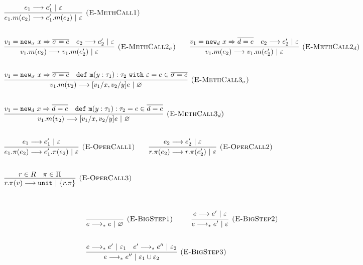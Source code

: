 \documentclass{llncs}
\newcommand{\keywadj}[1]{\mathtt{#1}}
\newcommand{\keyw}[1]{\keywadj{#1}~}
\begin{document}
\[
\begin{array}{lll}

	\infer[\textsc{(E-MethCall1)}]
		{e_1.m(e_2) \longrightarrow e_1'.m(e_2)~|~\varepsilon}
		{e_1 \longrightarrow e_1'~|~\varepsilon}\\[5ex]

	\infer[\textsc{(E-MethCall2$_{\sigma}$)}]
		{v_1.m(e_2) \longrightarrow v_1.m(e_2')~|~\varepsilon}
		{v_1 = \keywadj{new}_{\sigma}~x \Rightarrow \overline{\sigma = e} & e_2 \longrightarrow e_2'~|~\varepsilon}
				
		~~~~~~
	\infer[\textsc{(E-MethCall2$_d$)}]
		{v_1.m(e_2) \longrightarrow v_1.m(e_2')~|~\varepsilon}
		{v_1 = \keywadj{new}_{d}~x \Rightarrow \overline{d = e} & e_2 \longrightarrow e_2'~|~\varepsilon}
		\\[5ex]
		
	\infer[\textsc{(E-MethCall3$_{\sigma}$)}]
		{v_1.m(v_2)
			\longrightarrow
		 [v_1/x, v_2/y]e~|~\varnothing}
  		{v_1 = \keywadj{new}_{\sigma}~x \Rightarrow \overline{\sigma = e} & \keywadj{def~m}(y: \tau_1) : \tau_2~\keyw{with} \varepsilon = e \in \overline {\sigma = e}} \\[5ex]

	\infer[\textsc{(E-MethCall3$_{d}$)}]
		{v_1.m(v_2)
			\longrightarrow
		 [v_1/x, v_2/y]e~|~\varnothing}
  		{v_1 = \keywadj{new}_{d}~x \Rightarrow \overline{d = e} & \keywadj{def~m}(y: \tau_1) : \tau_2 = e \in \overline {d = e}} \\[5ex]
			
	\infer[\textsc{(E-OperCall1)}]
		{e_1.\pi(e_2)
			\longrightarrow
		 e_1'.\pi(e_2)~|~\varepsilon}
		{e_1 \longrightarrow e_1'~|~\varepsilon}
~~~~~~
			\infer[\textsc{(E-OperCall2)}]
		{r.\pi(e_2)
			\longrightarrow
		 r.\pi(e_2')~|~\varepsilon}
		{e_2 \longrightarrow e_2'~|~\varepsilon} \\[5ex]
			
			\infer[\textsc{(E-OperCall3)}]
		{r.\pi(v)
			\longrightarrow
		 \keywadj{unit}~|~\{r.\pi\}}
		{r \in R & \pi \in \Pi} \\[5ex]
			
\end{array}
\]




\[
\begin{array}{lll}

	\infer[\textsc{(E-BigStep1)}]
	{e \longrightarrow_* e~|~\varnothing}
	{} ~~~~~~~~
	
	\infer[\textsc{(E-BigStep2)}]
	{e \longrightarrow_* e'~|~\varepsilon}
	{e \longrightarrow e'~|~\varepsilon} \\[5ex]

	\infer[\textsc{(E-BigStep3)}]
	{e \longrightarrow_* e''~|~\varepsilon_1 \cup \varepsilon_2}
	{e \longrightarrow_* e'~|~\varepsilon_1 & e' \longrightarrow_* e''~|~\varepsilon_2}

\end{array}
\]
\end{document}
